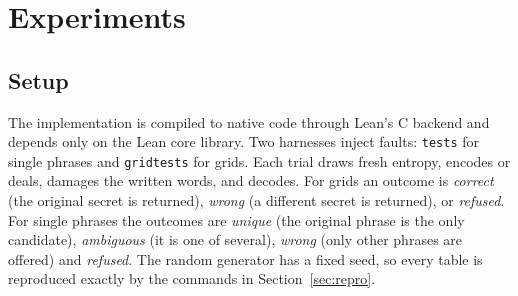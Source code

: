 \documentclass[numeric]{anvil-paper}
\newcommand{\code}[1]{\texttt{#1}}
\begin{document}
\section{Experiments}
\label{sec:experiments}

\subsection{Setup}

The implementation is compiled to native code through Lean's C backend and
depends only on the Lean core library. Two harnesses inject faults:
\code{tests} for single phrases and \code{gridtests} for grids. Each trial
draws fresh entropy, encodes or deals, damages the written words, and decodes.
For grids an outcome is \emph{correct} (the original secret is returned),
\emph{wrong} (a different secret is returned), or \emph{refused}. For single
phrases the outcomes are \emph{unique} (the original phrase is the only
candidate), \emph{ambiguous} (it is one of several), \emph{wrong} (only other
phrases are offered) and \emph{refused}. The random generator has a fixed seed,
so every table is reproduced exactly by the commands in
Section~\ref{sec:repro}.
\end{document}
